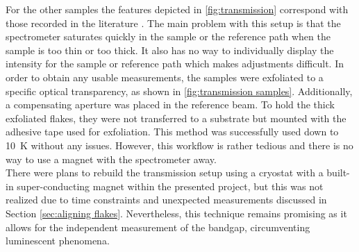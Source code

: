 \documentclass[
	twoside,
	parskip=half,
	a4paper,
]{scrbook}
\begin{document}
For the other samples the features depicted in \autoref{fig:transmission} correspond with those recorded in the literature \cite{CrPS4_transmission, NiPS3_transmission, FePS3_transmission}.
The main problem with this setup is that the spectrometer saturates quickly in the sample or the reference path when the sample is too thin or too thick.
It also has no way to individually display the intensity for the sample or reference path which makes adjustments difficult.
In order to obtain any usable measurements, the samples were exfoliated to a specific optical transparency, as shown in \autoref{fig:transmission samples}.
Additionally, a compensating aperture was placed in the reference beam.
To hold the thick exfoliated flakes, they were not transferred to a substrate but mounted with the adhesive tape used for exfoliation. 
This method was successfully used down to \SI{10}{K} without any issues.
However, this workflow is rather tedious and there is no way to use a magnet with the spectrometer away.\\
There were plans to rebuild the transmission setup using a cryostat with a built-in super-conducting magnet within the presented project, but this was not realized due to time constraints and unexpected measurements discussed in Section \ref{sec:aligning flakes}.
Nevertheless, this technique remains promising as it allows for the independent measurement of the bandgap, circumventing luminescent phenomena.

\clearpage
\end{document}
